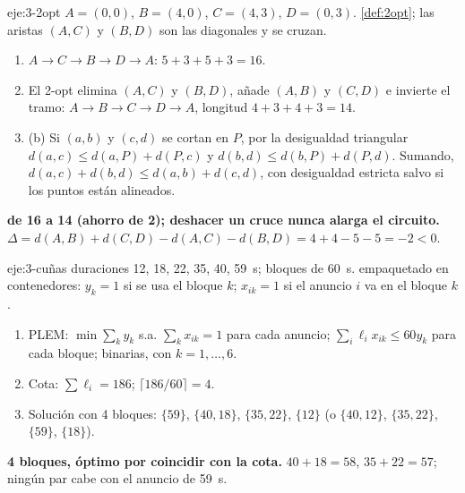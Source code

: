 \begin{solucion}{eje:3-2opt}
\datos $A=(0,0)$, $B=(4,0)$, $C=(4,3)$, $D=(0,3)$.
\planteamiento \cref{def:2opt}; las aristas $(A,C)$ y $(B,D)$ son las diagonales y se cruzan.
\pasos
\begin{enumerate}[label=\arabic*.]
  \item $A\to C\to B\to D\to A$: $5+3+5+3=16$.
  \item El 2-opt elimina $(A,C)$ y $(B,D)$, añade $(A,B)$ y $(C,D)$ e invierte el tramo: $A\to B\to C\to D\to A$, longitud $4+3+4+3=14$.
  \item (b) Si $(a,b)$ y $(c,d)$ se cortan en $P$, por la desigualdad triangular $d(a,c)\le d(a,P)+d(P,c)$ y $d(b,d)\le d(b,P)+d(P,d)$. Sumando, $d(a,c)+d(b,d)\le d(a,b)+d(c,d)$, con desigualdad estricta salvo si los puntos están alineados.
\end{enumerate}
\resultado \textbf{de 16 a 14 (ahorro de 2); deshacer un cruce nunca alarga el circuito.}
\comprobacion $\Delta=d(A,B)+d(C,D)-d(A,C)-d(B,D)=4+4-5-5=-2<0$.
\end{solucion}

\begin{solucion}{eje:3-cuñas}
\datos duraciones 12, 18, 22, 35, 40, 59~s; bloques de 60~s.
\planteamiento empaquetado en contenedores: $y_k=1$ si se usa el bloque $k$; $x_{ik}=1$ si el anuncio $i$ va en el bloque $k$.
\pasos
\begin{enumerate}[label=\arabic*.]
  \item PLEM: $\min\sum_ky_k$ s.a. $\sum_kx_{ik}=1$ para cada anuncio; $\sum_i\ell_ix_{ik}\le 60y_k$ para cada bloque; binarias, con $k=1,\dots,6$.
  \item Cota: $\sum\ell_i=186$; $\lceil 186/60\rceil=4$.
  \item Solución con 4 bloques: $\{59\}$, $\{40,18\}$, $\{35,22\}$, $\{12\}$ (o $\{40,12\}$, $\{35,22\}$, $\{59\}$, $\{18\}$).
\end{enumerate}
\resultado \textbf{4 bloques, óptimo por coincidir con la cota.}
\comprobacion $40+18=58$, $35+22=57$; ningún par cabe con el anuncio de 59~s.
\end{solucion}

